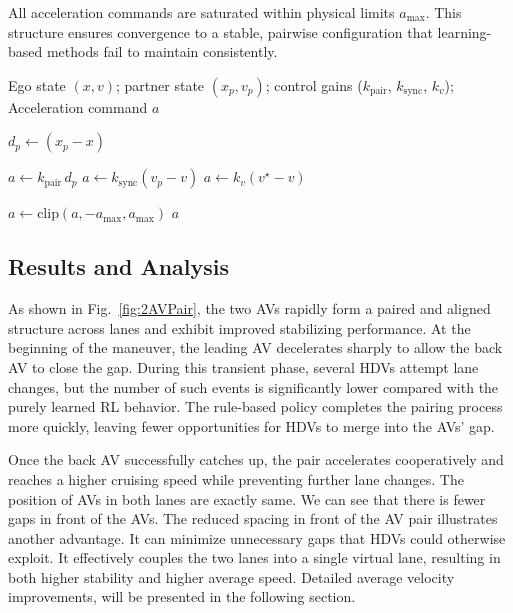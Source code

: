 \documentclass{ifacconf}
\begin{document}
All acceleration commands are saturated within physical limits $a_{\max}$. This structure ensures convergence to a stable,
pairwise configuration that learning-based methods fail to maintain consistently.

\begin{algorithm}[t!]
\caption{Pair-Aligned Control Strategy}
\label{alg:pair}
\begin{algorithmic}[1]
\Require Ego state $(x, v)$; partner state $(x_p, v_p)$; control gains ($k_{\mathrm{pair}}$, $ k_{\mathrm{sync}}$, $k_v$);
\Ensure Acceleration command $a$

\State $d_p \gets (x_p - x)$ 

    \State $a \gets k_{\mathrm{pair}}\, d_p$  
    \State $a \gets k_{\mathrm{sync}} (v_p - v)$ 
\Else
    \State $a \gets k_v (v^\star - v)$ 
\EndIf

\State $a \gets \mathrm{clip}(a, -a_{\max}, a_{\max})$
\State \Return $a$

\end{algorithmic}
\end{algorithm}
 
\subsection{Results and Analysis}

As shown in Fig.~\ref{fig:2AVPair}, the two AVs rapidly form a paired and aligned structure across lanes and exhibit improved stabilizing performance. At the beginning of the maneuver, the leading AV decelerates sharply to allow the back AV to close the gap. During this transient phase, several HDVs attempt lane changes, but the number of such events is significantly lower compared with the purely learned RL behavior. The rule-based policy completes the pairing process more quickly, leaving fewer opportunities for HDVs to merge into the AVs’ gap.

Once the back AV successfully catches up, the pair accelerates cooperatively and reaches a higher cruising speed while preventing further lane changes. The position of AVs in both lanes are exactly same. We can see that there is fewer gaps in front of the AVs. The reduced spacing in front of the AV pair illustrates another advantage. It can minimize unnecessary gaps that HDVs could otherwise exploit. It effectively couples the two lanes into a single virtual lane, resulting in both higher stability and higher average speed. Detailed average velocity improvements, will be presented in the following section.
\end{document}
